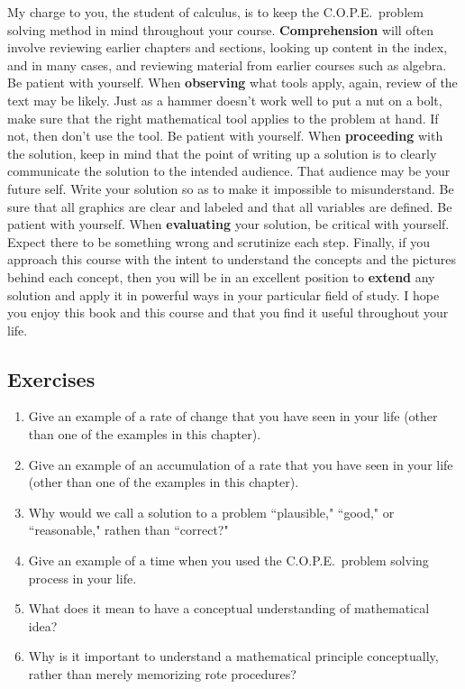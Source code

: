 My charge to you, the student of calculus, is to keep the C.O.P.E.\ problem solving method in mind throughout your course. {\bf Comprehension} will often involve reviewing earlier chapters and sections, looking up content in the index, and in many cases, and reviewing material from earlier courses such as algebra. Be patient with yourself. When {\bf observing} what tools apply, again, review of the text may be likely. Just as a hammer doesn't work well to put a nut on a bolt, make sure that the right mathematical tool applies to the problem at hand. If not, then don't use the tool. Be patient with yourself. When {\bf proceeding} with the solution, keep in mind that the point of writing up a solution is to clearly communicate the solution to the intended audience. That audience may be your future self. Write  your solution so as to make it impossible to misunderstand. Be sure that all graphics are clear and labeled and that all variables are defined. Be patient with yourself. When {\bf evaluating} your solution, be critical with yourself. Expect there to be something wrong and scrutinize each step. Finally, if you approach this course with the intent to understand the concepts and the pictures behind each concept, then you will be in an excellent position to {\bf extend} any solution and apply it in powerful ways in your particular field of study. I hope you enjoy this book and this course and that you find it useful throughout your life.


\subsection{Exercises}
\label{0-3-exercises}

\begin{enumerate}

    \item Give an example of a rate of change that you have seen in your life (other than one of the examples in this chapter).

    \item Give an example of an accumulation of a rate that you have seen in your life (other than one of the examples in this chapter).

    \item Why would we call a solution to a problem ``plausible," ``good," or ``reasonable," rathen than ``correct?"

    \item Give an example of a time when you used the C.O.P.E.\ problem solving process in your life.

    \item What does it mean to have a conceptual understanding of mathematical idea?

    \item Why is it important to understand a mathematical principle conceptually, rather than merely memorizing rote procedures?

\end{enumerate}

